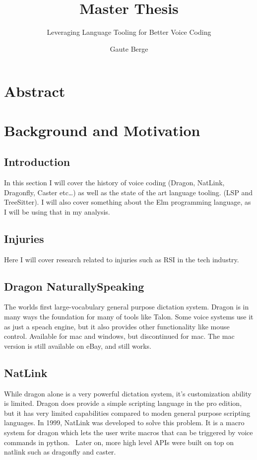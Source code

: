 \documentclass[a4paper,english]{ifimaster}
\title{Master Thesis}
\subtitle{Leveraging Language Tooling for Better Voice Coding}
\author{Gaute Berge}
\begin{document}
\duoforside[dept={Department of Informatics},
program={Informatics: Programming and System Architecture},
long]

\frontmatter{}
\chapter*{Abstract}

\tableofcontents{}
\listoffigures{}
\listoftables{}


\mainmatter{}
\chapter{Background and Motivation}

\section{Introduction}
In this section I will cover the history of voice coding (Dragon, NatLink, Dragonfly, Caster etc\ldots)
as well as the state of the art language tooling. (LSP and TreeSitter).
I will also cover something about the Elm programming language, as I will be using that in my analysis.


\section{Injuries}
Here I will cover research related to injuries such as RSI in the tech industry.

\section{Dragon NaturallySpeaking}
The worlds first large-vocabulary general purpose dictation system.
Dragon is in many ways the foundation for many of tools like Talon.
Some voice systems use it as just a speach engine, but it also provides other functionality like mouse control.
Available for mac and windows, but discontinued for mac.%
The mac version is still available on eBay, and still works. %

\section{NatLink}
While dragon alone is a very powerful dictation system, it's customization ability is limited.
Dragon does provide a simple scripting language in the pro edition, but it has very limited capabilities compared to
moden general purpose scripting languages.
In 1999, NatLink was developed to solve this problem. It is a macro system for dragon which lets the user write macros that can be triggered by voice commands
in python.~\parencite{gould2001implementation}
Later on, more high level APIs were built on top on natlink such as dragonfly and caster. %
\end{document}
